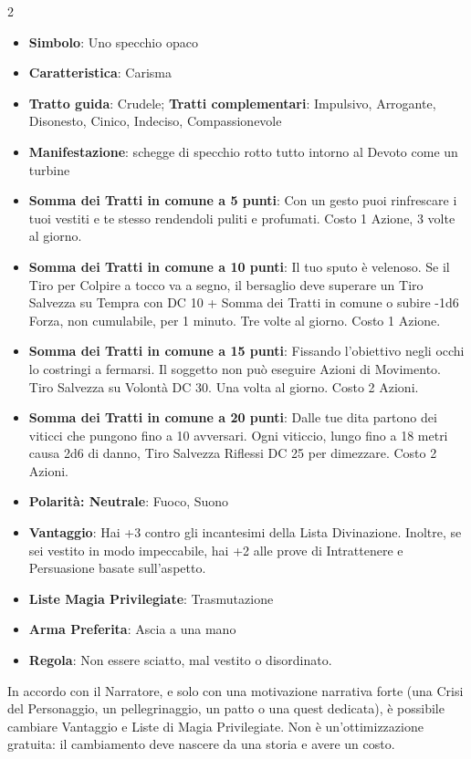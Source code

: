 \begin{multicols}{2}
\begin{itemize}[leftmargin=*] \setlength{\itemsep}{0pt}
\item \textbf{Simbolo}: Uno specchio opaco
\item \textbf{Caratteristica}: Carisma
\item \textbf{Tratto guida}: Crudele; \textbf{Tratti complementari}: Impulsivo, Arrogante, Disonesto, Cinico, Indeciso, Compassionevole
\item \textbf{Manifestazione}: schegge di specchio rotto tutto intorno al Devoto come un turbine
\item \textbf{Somma dei Tratti in comune a 5 punti}: Con un gesto puoi rinfrescare i tuoi vestiti e te stesso rendendoli puliti e profumati. Costo 1 Azione, 3 volte al giorno.
\item \textbf{Somma dei Tratti in comune a 10 punti}: Il tuo sputo è velenoso. Se il Tiro per Colpire a tocco va a segno, il bersaglio deve superare un Tiro Salvezza su Tempra con DC 10 + Somma dei Tratti in comune o subire -1d6 Forza, non cumulabile, per 1 minuto. Tre volte al giorno. Costo 1 Azione.
\item \textbf{Somma dei Tratti in comune a 15 punti}: Fissando l'obiettivo negli occhi lo costringi a fermarsi. Il soggetto non può eseguire Azioni di Movimento. Tiro Salvezza su Volontà DC 30. Una volta al giorno. Costo 2 Azioni.
\item \textbf{Somma dei Tratti in comune a 20 punti}: Dalle tue dita partono dei viticci che pungono fino a 10 avversari. Ogni viticcio, lungo fino a 18 metri causa 2d6 di danno, Tiro Salvezza Riflessi DC 25 per dimezzare. Costo 2 Azioni.
\item \textbf{Polarità: Neutrale}: Fuoco, Suono
\item \textbf{Vantaggio}: Hai +3 contro gli incantesimi della Lista Divinazione. Inoltre, se sei vestito in modo impeccabile, hai +2 alle prove di Intrattenere e Persuasione basate sull'aspetto.
\item \textbf{Liste Magia Privilegiate}: Trasmutazione
\item \textbf{Arma Preferita}: Ascia a una mano
\item \textbf{Regola}: Non essere sciatto, mal vestito o disordinato.
\end{itemize}

\begin{narratore}
In accordo con il Narratore, e solo con una motivazione narrativa forte (una Crisi del Personaggio, un pellegrinaggio, un patto o una quest dedicata), è possibile cambiare Vantaggio e Liste di Magia Privilegiate. Non è un'ottimizzazione gratuita: il cambiamento deve nascere da una storia e avere un costo.
\end{narratore}


\end{multicols}
